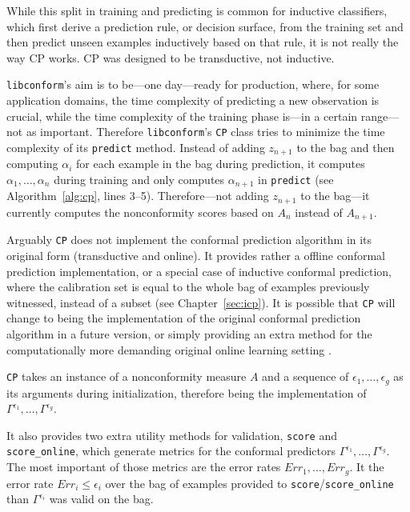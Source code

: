 \documentclass[twoside,11pt]{article}
\def\libconform{\texttt{libconform}}
\begin{document}
While this split in training and predicting is common for
inductive classifiers, which first derive a prediction
rule, or decision surface, from the training set and then
predict unseen examples inductively based on that rule,
it is not really the way CP works. CP was designed to be
transductive, not inductive.

\libconform{}'s aim is to be---one day---ready for
production, where, for some application domains, the time
complexity of predicting a new observation is crucial,
while the time complexity of the training phase
is---in a certain range---not as important.
Therefore \libconform{}'s \texttt{CP} class tries to
minimize the time complexity of its \texttt{predict}
method. Instead of adding $z_{n+1}$ to the bag and then
computing $\alpha_i$ for each example in the bag during
prediction, it computes $\alpha_1,\dots,\alpha_n$ during
training and only computes $\alpha_{n+1}$ in
\texttt{predict} (see Algorithm~\ref{alg:cp}, lines 3--5).
Therefore---not adding $z_{n+1}$ to the bag---it
currently computes the nonconformity scores based on
$A_n$ instead of $A_{n+1}$.

Arguably \texttt{CP} does not implement the conformal
prediction algorithm in its original form (transductive and
online). It provides rather a offline conformal prediction
implementation, or a special case of inductive conformal
prediction, where the calibration set is equal to the whole
bag of examples previously witnessed, instead of a subset
(see Chapter~\ref{sec:icp}).
It is possible that \texttt{CP} will change to being the
implementation of the original conformal prediction
algorithm in a future version, or simply providing an extra
method for the computationally more demanding original
online learning setting \citep[see][Chapter 2]{alrw}.

\texttt{CP} takes an instance of a nonconformity measure
$A$ and a sequence of $\epsilon_1,\dots,\epsilon_{g}$
as its arguments during initialization, therefore being the
implementation of
$\Gamma^{\epsilon_1},\dots,\Gamma^{\epsilon_g}$.

It also provides two extra utility methods for validation,
\texttt{score} and \texttt{score\_online}, which generate
metrics for the conformal predictors
$\Gamma^{\epsilon_1},\dots,\Gamma^{\epsilon_g}$.
The most important of those metrics are the error rates
$Err_1,\dots,Err_{g}$.
It the error rate $Err_i \leq \epsilon_i$ over the bag of
examples provided to \texttt{score}/\texttt{score\_online}
than $\Gamma^{\epsilon_i}$ was valid on the bag.
\end{document}
